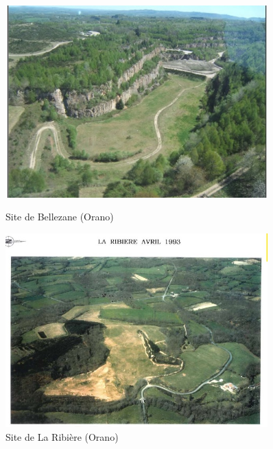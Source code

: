 \documentclass{article}
\begin{document}

\begin{figure}[H]
    \centering
    \begin{minipage}{0.5\textwidth}
        \centering
        \includegraphics[width=0.9\textwidth]{I_A_3.jpg} 
        \caption{Site de Bellezane (Orano)}
        \label{fig:bellezane1}
    \end{minipage}\hfill
    \begin{minipage}{0.5\textwidth}
        \centering
        \includegraphics[width=0.9\textwidth]{I_A_4.jpg} 
        \caption{Site de La Ribière (Orano)}
        \label{fig:ribiere1}
    \end{minipage}
\end{figure}
\end{document}
